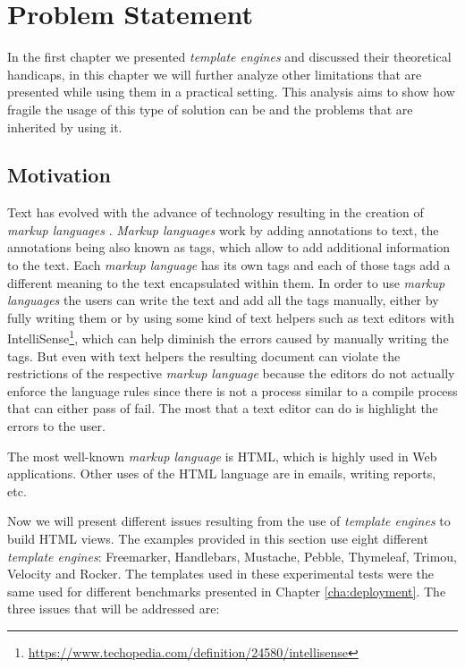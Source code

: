 \chapter{Problem Statement}
\label{cha:problem}

\sloppy

In the first chapter we presented \textit{template engines} and discussed their theoretical handicaps, in this chapter we will further analyze other limitations that are presented while using them in a practical setting. This analysis aims to show how fragile the usage of this type of solution can be and the problems that are inherited by using it.

\section{Motivation}
\label{sec:motivation}

Text has evolved with the advance of technology resulting in the creation of \textit{markup languages} \cite{markuplanguages}. \textit{Markup languages} work by adding annotations to text, the annotations being also known as tags, which allow to add additional information to the text. Each \textit{markup language} has its own tags and each of those tags add a different meaning to the text encapsulated within them. In order to use \textit{markup languages} the users can write the text and add all the tags manually, either by fully writing them or by using some kind of text helpers such as text editors with IntelliSense\footnote{\url{https://www.techopedia.com/definition/24580/intellisense}}, which can help diminish the errors caused by manually writing the tags. But even with text helpers the resulting document can violate the restrictions of the respective \textit{markup language} because the editors do not actually enforce the language rules since there is not a process similar to a compile process that can either pass of fail. The most that a text editor can do is highlight the errors to the user.

\noindent
The most well-known \textit{markup language} is \ac{HTML}, which is highly used in Web applications. Other uses of the \ac{HTML} language are in emails, writing reports, etc.

\noindent
Now we will present different issues resulting from the use of \textit{template engines} to build \ac{HTML} views. The examples provided in this section use eight different \textit{template engines}: Freemarker\cite{freemarker}, Handlebars\cite{handlebars}, Mustache\cite{mustache}, Pebble\cite{pebble}, Thymeleaf\cite{thymeleaf}, Trimou\cite{trimou}, Velocity\cite{velocity} and Rocker\cite{rocker}. The templates used in these experimental tests were the same used for different benchmarks presented in Chapter \ref{cha:deployment}. The three issues that will be addressed are:

